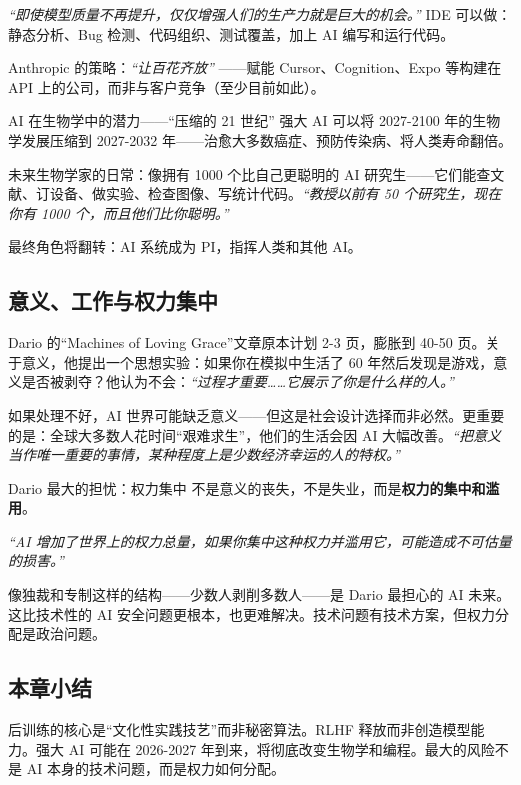 \documentclass[a4paper]{article}
\begin{document}
\textit{``即使模型质量不再提升，仅仅增强人们的生产力就是巨大的机会。''} IDE 可以做：静态分析、Bug 检测、代码组织、测试覆盖，加上 AI 编写和运行代码。

Anthropic 的策略：\textit{``让百花齐放''} ——赋能 Cursor、Cognition、Expo 等构建在 API 上的公司，而非与客户竞争（至少目前如此）。

\begin{importantbox}{AI 在生物学中的潜力——``压缩的 21 世纪''}
强大 AI 可以将 2027-2100 年的生物学发展压缩到 2027-2032 年——治愈大多数癌症、预防传染病、将人类寿命翻倍。

未来生物学家的日常：像拥有 1000 个比自己更聪明的 AI 研究生——它们能查文献、订设备、做实验、检查图像、写统计代码。\textit{``教授以前有 50 个研究生，现在你有 1000 个，而且他们比你聪明。''}

最终角色将翻转：AI 系统成为 PI，指挥人类和其他 AI。
\end{importantbox}

\subsection{意义、工作与权力集中}

Dario 的``Machines of Loving Grace''文章原本计划 2-3 页，膨胀到 40-50 页。关于意义，他提出一个思想实验：如果你在模拟中生活了 60 年然后发现是游戏，意义是否被剥夺？他认为不会：\textit{``过程才重要……它展示了你是什么样的人。''}

如果处理不好，AI 世界可能缺乏意义——但这是社会设计选择而非必然。更重要的是：全球大多数人花时间``艰难求生''，他们的生活会因 AI 大幅改善。\textit{``把意义当作唯一重要的事情，某种程度上是少数经济幸运的人的特权。''}

\begin{warningbox}{Dario 最大的担忧：权力集中}
不是意义的丧失，不是失业，而是\textbf{权力的集中和滥用}。

\textit{``AI 增加了世界上的权力总量，如果你集中这种权力并滥用它，可能造成不可估量的损害。''}

像独裁和专制这样的结构——少数人剥削多数人——是 Dario 最担心的 AI 未来。这比技术性的 AI 安全问题更根本，也更难解决。技术问题有技术方案，但权力分配是政治问题。
\end{warningbox}

\subsection{本章小结}

后训练的核心是``文化性实践技艺''而非秘密算法。RLHF 释放而非创造模型能力。强大 AI 可能在 2026-2027 年到来，将彻底改变生物学和编程。最大的风险不是 AI 本身的技术问题，而是权力如何分配。
\end{document}

